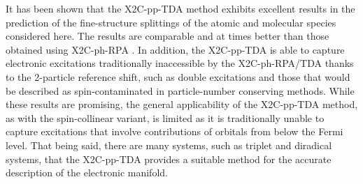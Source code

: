 It has been shown that the X2C-pp-TDA method exhibits excellent results in the
prediction of the fine-structure splittings of the atomic and molecular species
considered here.  The results are comparable and at times better than those
obtained using X2C-ph-RPA \cite{Li16_3711}. In addition, the X2C-pp-TDA is able
to capture electronic excitations traditionally inaccessible by the
X2C-ph-RPA/TDA thanks to the 2-particle reference shift, such as double
excitations and those that would be described as spin-contaminated in
particle-number conserving methods.  While these results are promising, the
general applicability of the X2C-pp-TDA method, as with the spin-collinear
variant, is limited as it is traditionally unable to capture excitations that
involve contributions of orbitals from below the Fermi level.  That being said,
there are many systems, such as triplet and diradical systems, that the
X2C-pp-TDA provides a suitable method for the accurate description of the
electronic manifold.

